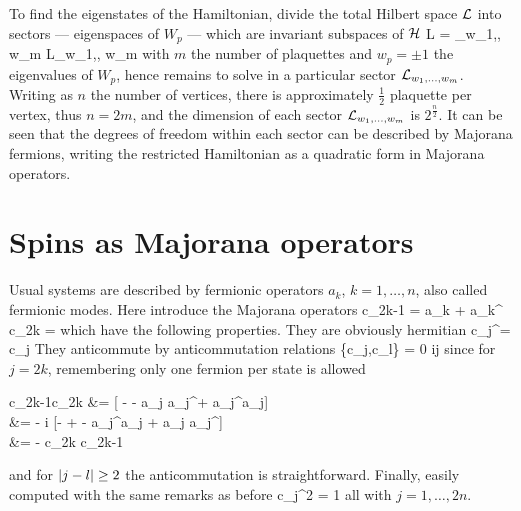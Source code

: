 		To find the eigenstates of the Hamiltonian, divide the total Hilbert space $\mathcal L$ into sectors --- eigenspaces of $W_p$ --- which are invariant subspaces of $\mathcal H$
		\be \mc L = \bigoplus_{w_1,\dotsc, w_m} \mc L_{w_1,\dotsc, w_m} \ee
		with $m$ the number of plaquettes and $w_p = \pm 1$ the eigenvalues of $W_p$, hence remains to solve in a particular sector $\mathcal L_{w_1,\dotsc, w_m}$. Writing as $n$ the number of vertices, there is approximately $\frac 1 2$ plaquette per vertex, thus $n=2m$, and the dimension of each sector $\mathcal L_{w_1,\dotsc, w_m}$ is $2^{\frac n 2}$. It can be seen that the degrees of freedom within each sector can be described by Majorana fermions, writing the restricted Hamiltonian as a quadratic form in Majorana operators.

	\section{Spins as Majorana operators}

		Usual systems are described by fermionic operators $a_k$, $k=1,\dotsc, n$, also called fermionic modes. Here introduce the Majorana operators
		\be c_{2k-1} = a_k + a_k^\dagger {} c_{2k} =  \ee
		which have the following properties. They are obviously hermitian
		\be c_j^\dagger = c_j \ee
		They anticommute by anticommutation relations
		\be \{c_j,c_l\} = 0  i\neq j \ee
		since for $j = 2k$, remembering only one fermion per state is allowed
		\be \begin{split} c_{2k-1}c_{2k} &= [ -  - a_j a_j^\dagger + a_j^\dagger a_j] \\ &= - i [- +  - a_j^\dagger a_j + a_j a_j^\dagger ] \\ &= - c_{2k} c_{2k-1} \end{split} \ee
		and for $\abs{j-l} \geq 2$ the anticommutation is straightforward. Finally, easily computed with the same remarks as before
		\be c_j^2 = 1 \label{eq:csquared1} \ee
		all with $j=1,\dotsc, 2n$. 

